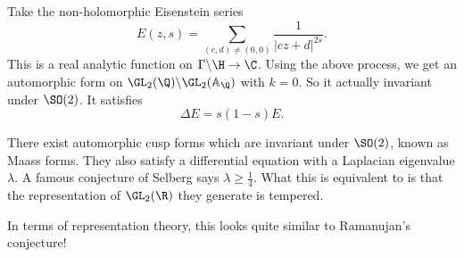 \documentclass[a4paper]{article}
\newcommand\A{\mathbb{A}}
\begin{document}
\begin{eg}
  Take the non-holomorphic Eisenstein series
  \[
    E(z, s) = \sum_{(c, d) \not= (0, 0)} \frac{1}{|cz + d|^{2s}}.
  \]
  This is a real analytic function on $\Gamma \backslash \H \to \C$. Using the above process, we get an automorphic form on $\GL_2(\Q) \backslash \GL_2(\A_\Q)$ with $k = 0$. So it actually invariant under $\SO(2)$. It satisfies
  \[
    \Delta E = s(1 - s) E.
  \]
\end{eg}
There exist automorphic cusp forms which are invariant under $\SO(2)$, known as Maass forms. They also satisfy a differential equation with a Laplacian eigenvalue $\lambda$. A famous conjecture of Selberg says $\lambda \geq \frac{1}{4}$. What this is equivalent to is that the representation of $\GL_2(\R)$ they generate is tempered.

In terms of representation theory, this looks quite similar to Ramanujan's conjecture!
\printindex
\end{document}
